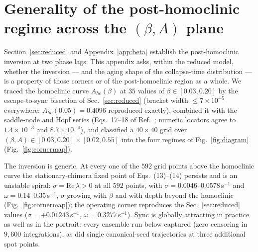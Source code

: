 
\section{Generality of the post-homoclinic regime across the $(\beta, A)$ plane}\label{app:corner}

Section~\ref{sec:reduced} and Appendix~\ref{app:beta} establish the
post-homoclinic inversion at two phase lags. This appendix asks, within the
reduced model, whether the inversion --- and the aging shape of the collapse-time
distribution --- is a property of those corners or of the post-homoclinic region
as a whole. We traced the homoclinic curve $A_{hc}(\beta)$ at $35$ values of
$\beta \in [0.03, 0.20]$ by the escape-to-sync bisection of
Sec.~\ref{sec:reduced} (bracket width $\le 7\times10^{-5}$ everywhere;
$A_{hc}(0.05) = 0.4096$ reproduced exactly), combined it with the saddle-node
and Hopf series (Eqs.~17--18 of Ref.~\cite{abrams2008}; numeric locators agree
to $1.4\times10^{-3}$ and $8.7\times10^{-4}$), and classified a $40\times40$
grid over $(\beta, A) \in [0.03, 0.20] \times [0.02, 0.55]$ into the four
regimes of Fig.~\ref{fig:diagram} (Fig.~\ref{fig:cornermap}).

The inversion is generic. At every one of the $592$ grid points above the
homoclinic curve the stationary-chimera fixed point of Eqs.~(13)--(14) persists
and is an unstable spiral: $\sigma = \mathrm{Re}\,\lambda > 0$ at all $592$
points, with $\sigma = 0.0046$--$0.0578$\,s$^{-1}$ and
$\omega = 0.14$--$0.35$\,s$^{-1}$, $\sigma$ growing with $\beta$ and with depth
beyond the homoclinic (Fig.~\ref{fig:cornermap}); the operating corner
reproduces the Sec.~\ref{sec:reduced} values
($\sigma = +0.01243$\,s$^{-1}$, $\omega = 0.3277$\,s$^{-1}$). Sync is globally
attracting in practice as well as in the portrait: every ensemble run below
captured (zero censoring in $9{,}600$ integrations), as did single
canonical-seed trajectories at three additional spot points.

